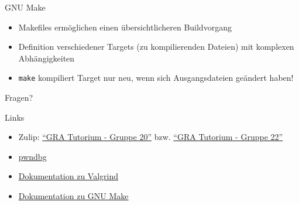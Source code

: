 \begin{frame}[c, fragile]{GNU Make}{}
	\begin{itemize}
		\item Makefiles ermöglichen einen übersichtlicheren Buildvorgang
		\item Definition verschiedener Targets (zu kompilierenden Dateien) mit komplexen Abhängigkeiten
		\item \verb|make| kompiliert Target nur neu, wenn sich Ausgangsdateien geändert haben!
	\end{itemize}
\end{frame}

\begin{frame}[c]{}{}
	\begin{center}
		\LARGE Fragen?
	\end{center}
\end{frame}

\begin{frame}[fragile, c]{Links}{}
	\begin{itemize}
		\item Zulip: \href{https://zulip.in.tum.de/#narrow/stream/2267-GRA-Tutorium---Gruppe-20}{\enquote{GRA Tutorium - Gruppe 20}}
		      bzw. \href{https://zulip.in.tum.de/#narrow/stream/2269-GRA-Tutorium---Gruppe-22}{\enquote{GRA Tutorium - Gruppe 22}}
		\item \href{https://github.com/pwndbg/pwndbg}{pwndbg}
		\item \href{https://valgrind.org/docs/manual/manual.html}{Dokumentation zu Valgrind}
		\item \href{https://www.gnu.org/software/make/manual/html_node/index.html}{Dokumentation zu GNU Make}
	\end{itemize}
\end{frame}

\maketitle


